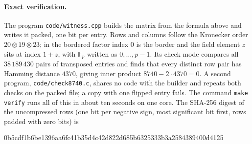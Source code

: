 \documentclass[11pt,letterpaper]{article}
\newcommand{\F}{\mathbb F}
\begin{document}
\paragraph{Exact verification.}
The program \texttt{code/witness.cpp} builds the matrix from the formula above and writes it packed, one bit per entry. Rows and columns follow the Kronecker order $20\otimes19\otimes23$; in the bordered factor index $0$ is the border and the field element $z$ sits at index $1+z$, with $\F_p$ written as $0,\dots,p-1$. Its check mode compares all \(38\,189\,430\) pairs of transposed entries and finds that every distinct row pair has Hamming distance \(4370\), giving inner product \(8740-2\cdot4370=0\). A second program, \texttt{code/check8740.c}, shares no code with the builder and repeats both checks on the packed file; a copy with one flipped entry fails. The command \texttt{make verify} runs all of this in about ten seconds on one core. The SHA-256 digest of the uncompressed rows (one bit per negative sign, most significant bit first, rows padded with zero bits) is
\begin{center}\footnotesize\ttfamily 0b5cdf1b6be1396aa6fc41b35d4c42d822d685b6325333b3a2584389400d4125\end{center}
\end{document}

